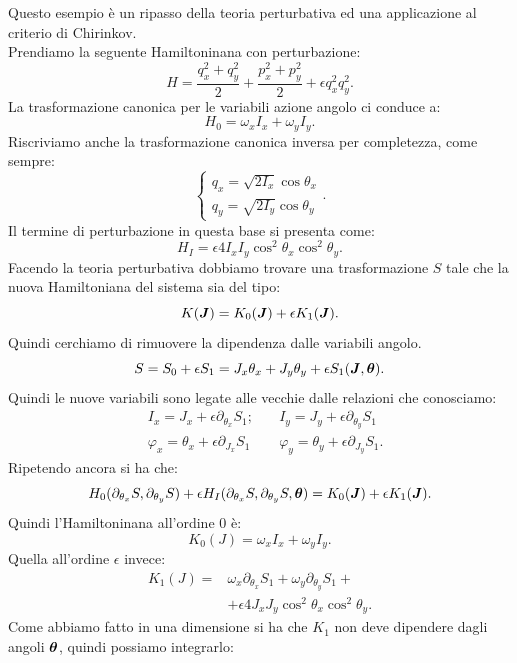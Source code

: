 \noindent
\begin{exmp}
    Questo esempio è un ripasso della teoria perturbativa ed una applicazione al criterio di Chirinkov.\\
    Prendiamo la seguente Hamiltoninana con perturbazione:
    \[
        H = \frac{q_x^2+q_y^2}{2} + \frac{p_x^2+p_y^2}{2} + \epsilon q_x^2q_y^2
    .\] 
    La trasformazione canonica per le variabili azione angolo ci conduce a:
    \[
        H_0 = \omega_xI_x + \omega_yI_y
    .\] 
    Riscriviamo anche la trasformazione canonica inversa per completezza, come sempre:
    \[
        \begin{cases}
            q_x =\sqrt{2I_x} \cos\theta_x\\
	    q_y = \sqrt{2I_y} \cos\theta_y
        \end{cases}
    .\] 
    Il termine di perturbazione in questa base si presenta come:
    \[
        H_I = \epsilon 4 I_xI_y\cos^2\theta_x\cos^2\theta_y
    .\]  
    Facendo la teoria perturbativa dobbiamo trovare una trasformazione $S$ tale che la nuova Hamiltoniana del sistema sia del tipo:
    \[
	K(\boldsymbol{J}) = K_0(\boldsymbol{J}) + \epsilon K_1(\boldsymbol{J})
    .\] 
    Quindi cerchiamo di rimuovere la dipendenza dalle variabili angolo.
    \[
	S = S_0 + \epsilon S_1 = J_x\theta_x + J_y\theta_y + \epsilon S_1(\boldsymbol{J}, \boldsymbol{\theta})
    .\] 
    Quindi le nuove variabili sono legate alle vecchie dalle relazioni che conosciamo:
    \[\begin{aligned}
	& I_x = J_x +\epsilon  \partial_{\theta_x}S_1;  &\quad I_y = J_y +\epsilon  \partial_{\theta_y}S_1\\
	& \varphi_x = \theta_x +\epsilon  \partial_{J_x}S_1 &\quad \varphi_y = \theta_y + \epsilon\partial_{J_y}S_1
    .\end{aligned}\]
    Ripetendo ancora si ha che:
    \[
	H_0(\partial_{\theta_x}S, \partial_{\theta_y}S) + \epsilon  H_I(\partial_{\theta_x}S, \partial_{\theta_y}S, \boldsymbol{\theta}) = 
	K_0(\boldsymbol{J})+\epsilon K_1(\boldsymbol{J})
    .\] 
    Quindi l'Hamiltoninana all'ordine 0 è:
    \[
	K_0(J) = \omega_xI_x + \omega_yI_y
    .\] 
    Quella all'ordine $\epsilon$ invece:
    \[\begin{aligned}
	K_1(J) =& \omega_x\partial_{\theta_x}S_1 + \omega_y\partial_{\theta_y}S_1 + \\
	       &+ \epsilon 4 J_xJ_y\cos^2\theta_x\cos^2\theta_y
    .\end{aligned}\]
    Come abbiamo fatto in una dimensione si ha che $K_1$ non deve dipendere dagli angoli $\boldsymbol{\theta}$, quindi possiamo integrarlo:

\end{exmp}
